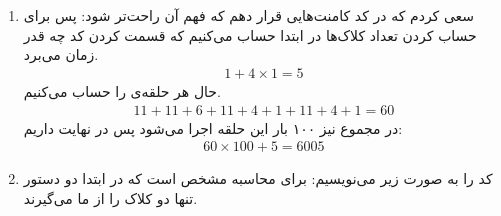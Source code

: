 \section{}
\begin{enumerate}
    \item سعی کردم که در کد کامنت‌هایی قرار دهم که فهم آن راحت‌تر شود:
    پس برای حساب کردن تعداد کلاک‌ها در ابتدا حساب می‌کنیم که قسمت
    کردن کد چه قدر زمان می‌برد.
    \begin{gather*}
        1 + 4 \times 1 = 5
    \end{gather*}
    حال هر حلقه‌ی
    را حساب می‌کنیم.
    \begin{gather*}
        11 + 11 + 6 + 11 + 4 + 1 + 11 + 4 + 1 = 60
    \end{gather*}
    در مجموع نیز ۱۰۰ بار این حلقه اجرا می‌شود پس در نهایت داریم:
    \begin{gather*}
        60 \times 100 + 5 = 6005
    \end{gather*}
    \item کد را به صورت زیر می‌نویسیم:
    برای محاسبه مشخص است که در ابتدا دو دستور  تنها دو کلاک را از ما می‌گیرند.
    
\end{enumerate}